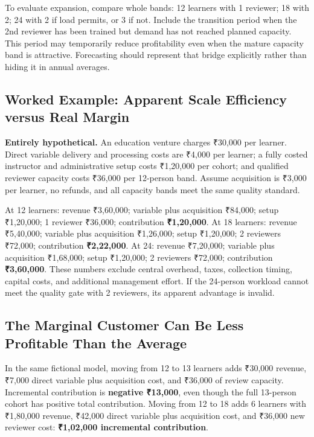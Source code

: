 To evaluate expansion, compare whole bands: 12 learners with 1 reviewer; 18 with 2; 24 with 2 if load permits, or 3 if not. Include the transition period when the 2nd reviewer has been trained but demand has not reached planned capacity. This period may temporarily reduce profitability even when the mature capacity band is attractive. Forecasting should represent that bridge explicitly rather than hiding it in annual averages.

\subsection{Worked Example: Apparent Scale Efficiency versus Real Margin}
\label{sec:worked_example_apparent_scale}

\textbf{Entirely hypothetical.} An education venture charges ₹30,000 per learner. Direct variable delivery and processing costs are ₹4,000 per learner; a fully costed instructor and administrative setup costs ₹1,20,000 per cohort; and qualified reviewer capacity costs ₹36,000 per 12-person band. Assume acquisition is ₹3,000 per learner, no refunds, and all capacity bands meet the same quality standard.

At 12 learners: revenue ₹3,60,000; variable plus acquisition ₹84,000; setup ₹1,20,000; 1 reviewer ₹36,000; contribution \textbf{₹1,20,000}. At 18 learners: revenue ₹5,40,000; variable plus acquisition ₹1,26,000; setup ₹1,20,000; 2 reviewers ₹72,000; contribution \textbf{₹2,22,000}. At 24: revenue ₹7,20,000; variable plus acquisition ₹1,68,000; setup ₹1,20,000; 2 reviewers ₹72,000; contribution \textbf{₹3,60,000}. These numbers exclude central overhead, taxes, collection timing, capital costs, and additional management effort. If the 24-person workload cannot meet the quality gate with 2 reviewers, its apparent advantage is invalid.

\subsection{The Marginal Customer Can Be Less Profitable Than the Average}
\label{sec:marginal_customer_profitability}

In the same fictional model, moving from 12 to 13 learners adds ₹30,000 revenue, ₹7,000 direct variable plus acquisition cost, and ₹36,000 of review capacity. Incremental contribution is \textbf{negative ₹13,000}, even though the full 13-person cohort has positive total contribution. Moving from 12 to 18 adds 6 learners with ₹1,80,000 revenue, ₹42,000 direct variable plus acquisition cost, and ₹36,000 new reviewer cost: \textbf{₹1,02,000 incremental contribution}.


